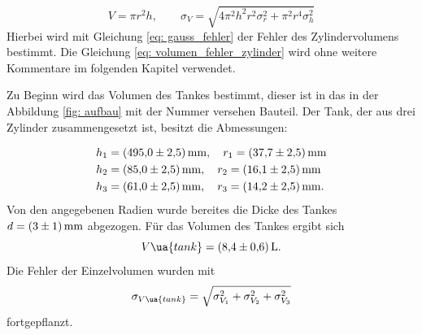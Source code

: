 \begin{equation}
  \label{eq: volumen_fehler_zylinder}
  V=\pi r^2 h, \qquad \sigma_{V}=\sqrt{4 \pi^{2} h^{2} r^{2} \sigma_{r}^{2}  + \pi^{2} r^{4} \sigma_{h}^{2} }
\end{equation}
Hierbei wird mit Gleichung \eqref{eq: gauss_fehler} der Fehler des Zylindervolumens bestimmt.
Die Gleichung \ref{eq: volumen_fehler_zylinder} wird ohne weitere Kommentare im folgenden Kapitel verwendet.

Zu Beginn wird das Volumen des Tankes bestimmt, dieser ist in das in der Abbildung \ref{fig: aufbau} mit der Nummer
 versehen Bauteil.
Der Tank, der aus drei Zylinder zusammengesetzt ist,  besitzt die Abmessungen:

\begin{align*}
h_1&=\SI{495 \pm 2.5}{\milli\meter}, \quad r_1=\SI{37.7\pm2.5}{\milli\meter} \\
h_2&=\SI{85 \pm 2.5}{\milli\meter}, \quad r_2=\SI{16.1\pm 2.5}{\milli\meter} \\
h_3&=\SI{61 \pm 2.5}{\milli\meter}, \quad r_3=\SI{14.2\pm 2.5}{\milli\meter}. \\
\end{align*}
Von den angegebenen Radien wurde bereites die Dicke des Tankes $d=\SI{3\pm1}{\milli\meter}$ abgezogen.
Für das Volumen des Tankes ergibt sich
\begin{equation}
  \label{eq:volumen Tank}
  V\ua{tank}=\SI{8.4\pm0.6}{\litre}.
\end{equation}
Die Fehler der Einzelvolumen wurden mit
\begin{equation}
  \label{eq:fehler_addi}
  \sigma_{V\ua{tank}}=\sqrt{\sigma_{V_{1}}^{2} + \sigma_{V_{2}}^{2}+\sigma_{V_{3}}^{2}}
\end{equation}
fortgepflanzt.


